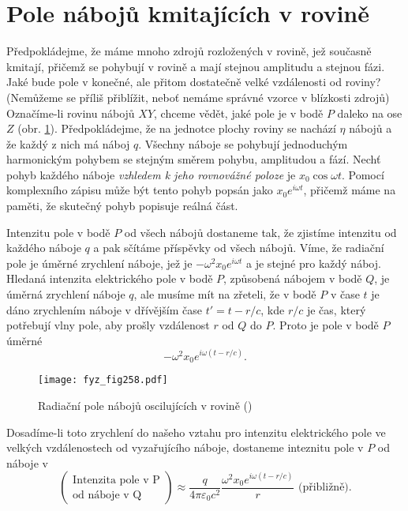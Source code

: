   \section{Pole nábojů kmitajících v rovině}\label{fyz:IchapXXXsecVII}
    Předpokládejme, že máme mnoho zdrojů rozložených v rovině, jež současně kmitají, přičemž se 
    pohybují v rovině a mají stejnou amplitudu a stejnou fázi. Jaké bude pole v konečné, ale přitom 
    dostatečně velké vzdálenosti od roviny? (Nemůžeme se příliš přiblížit, neboť nemáme správné 
    vzorce v blízkosti zdrojů) Označíme-li rovinu nábojů \(XY\), chceme vědět, jaké pole je v bodě 
    \(P\) daleko na ose \(Z\) (obr. \ref{fyz:fig258}). Předpokládejme, že na jednotce plochy roviny 
    se nachází \(\eta\) nábojů a že každý z nich má náboj \(q\). Všechny náboje se pohybují 
    jednoduchým harmonickým pohybem se stejným směrem pohybu, amplitudou a fází. Nechť pohyb 
    každého náboje \emph{vzhledem k jeho rovnovážné poloze} je \(x_0\cos\omega t\). Pomocí 
    komplexního zápisu může být tento pohyb popsán jako \(x_0e^{i\omega t}\), přičemž máme na 
    paměti, že skutečný pohyb popisuje reálná část. 
    
    Intenzitu pole v bodě \(P\) od všech nábojů dostaneme tak, že zjistíme intenzitu od každého 
    náboje \(q\) a pak sčítáme příspěvky od všech nábojů. Víme, že radiační pole je úměrné 
    zrychlení náboje, jež je \(-\omega^2x_0e^{i\omega t}\) a je stejné pro každý náboj. Hledaná 
    intenzita elektrického pole v bodě \(P\), způsobená nábojem v bodě \(Q\), je úměrná zrychlení 
    náboje \(q\), ale musíme mít na zřeteli, že v bodě \(P\) v čase \(t\) je dáno zrychlením náboje 
    v dřívějším čase \(t' = t - r/c\), kde \(r/c\) je čas, který potřebují vlny pole, aby prošly 
    vzdálenost \(r\) od \(Q\) do \(P\). Proto je pole v bodě \(P\) úměrné
    \begin{equation}\label{fyz:eq327}
      - \omega^2x_0e^{i\omega(t-r/c)}.
    \end{equation}
    
    \begin{figure}[ht!] %
      \centering
      \texttt{[image: fyz\_fig258.pdf]}
      \caption{Radiační pole nábojů oscilujících v rovině
               (\cite[s.~404]{Feynman01})}
      \label{fyz:fig258}
    \end{figure}
    
    Dosadíme-li toto zrychlení do našeho vztahu pro intenzitu elektrického pole ve velkých  
    vzdálenostech od vyzařujícího náboje, dostaneme inteznitu pole v \(P\) od náboje v 
    \begin{equation*}
      \left(\begin{matrix}
         \text{Intenzita pole v P}  \\
         \text{od náboje v Q}
      \end{matrix}\right) \approx 
      \frac{q}{4\pi\varepsilon_0c^2}
      \frac{\omega^2x_0e^{i\omega(t-r/c)}}{r}\text{ (přibližně)}.
    \end{equation*}
    
